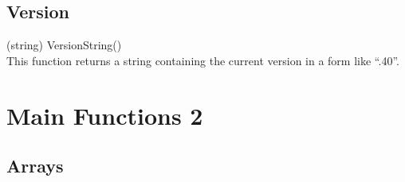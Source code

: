 \subsection{{\Xic} Version}

\begin{description}
\item{(string) \vt VersionString()}\\
This function returns a string containing the current {\Xic}
version in a form like ``{.40}''.

\end{description}


\section{Main Functions 2}
\subsection{Arrays}

